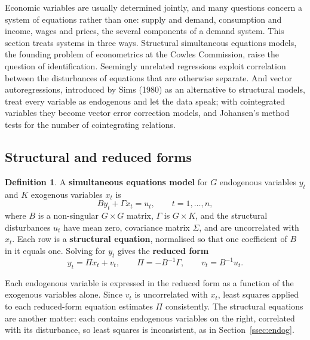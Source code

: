 \documentclass[11pt,a4paper]{article}
\numberwithin{equation}{section}
\theoremstyle{definition}
\newtheorem{defn}[thm]{Definition}
\begin{document}
Economic variables are usually determined jointly, and many questions concern a system of equations rather than one: supply and demand,
consumption and income, wages and prices, the several components of a demand system. This section treats systems in three ways. Structural
simultaneous equations models, the founding problem of econometrics at the Cowles Commission, raise the question of identification. Seemingly
unrelated regressions exploit correlation between the disturbances of equations that are otherwise separate. And vector autoregressions,
introduced by Sims (1980) as an alternative to structural models, treat every variable as endogenous and let the data speak; with cointegrated
variables they become vector error correction models, and Johansen's method tests for the number of cointegrating relations.

\subsection{Structural and reduced forms}
\label{ssec:structural}

\begin{defn}
A \textbf{simultaneous equations model} for $G$ endogenous variables $y_t$ and $K$ exogenous variables $x_t$ is
\[
By_t + \Gamma x_t = u_t, \qquad t = 1, \dots, n,
\]
where $B$ is a non-singular $G \times G$ matrix, $\Gamma$ is $G \times K$, and the structural disturbances $u_t$ have mean zero, covariance matrix $\Sigma$, and are
uncorrelated with $x_t$. Each row is a \textbf{structural equation}, normalised so that one coefficient of $B$ in it equals one. Solving for $y_t$ gives the
\textbf{reduced form}
\[
y_t = \Pi x_t + v_t, \qquad \Pi = -B^{-1}\Gamma, \qquad v_t = B^{-1}u_t .
\]
\end{defn}

Each endogenous variable is expressed in the reduced form as a function of the exogenous variables alone. Since $v_t$ is uncorrelated with $x_t$,
least squares applied to each reduced-form equation estimates $\Pi$ consistently. The structural equations are another matter: each contains
endogenous variables on the right, correlated with its disturbance, so least squares is inconsistent, as in Section~\ref{ssec:endog}.
\end{document}
